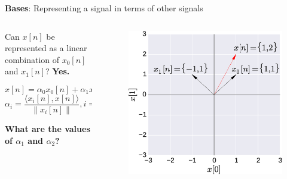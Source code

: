 \documentclass{beamer}
\begin{document}
\begin{frame}{\textbf{Bases}: Representing a signal in terms of other signals}\

\begin{columns}
	\begin{column}{.5\linewidth}
	  Can $x[n]$ be represented as a linear combination of $x_0[n]$ and $x_1[n]$? \textbf{Yes.}
	  
	  \[ x[n] = \alpha_0x_0[n] + \alpha_1x_1[n] \]
	  \[ \alpha_i = \frac{\langle x_i[n], x[n] \rangle}{\|x_i[n]\|}, i = 0, 1 \]
	  
	  \textbf{What are the values of $\alpha_1$ and $\alpha_2$?}

	\end{column}
	
	\begin{column}{.5\linewidth}
	\begin{figure}
	\includegraphics[width=\textwidth]{img/bases.eps}
	\end{figure}
	\end{column}
\end{columns}
\end{frame}
\end{document}
